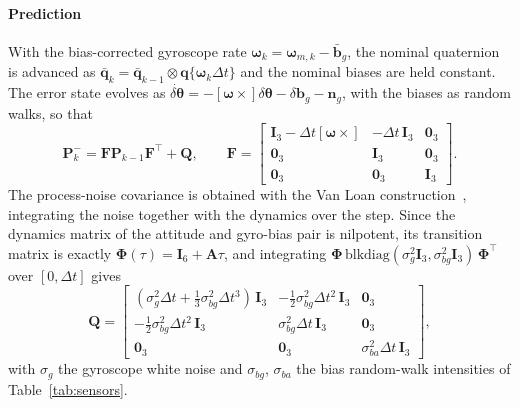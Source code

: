 \documentclass[preprint,12pt,a4paper]{elsarticle}
\begin{document}
\paragraph{Prediction}
With the bias-corrected gyroscope rate $\boldsymbol{\omega}_k=\boldsymbol{\omega}_{m,k}
-\bar{\mathbf{b}}_g$, the nominal quaternion is advanced as
$\bar{\mathbf{q}}_k=\bar{\mathbf{q}}_{k-1}\otimes\mathbf{q}\{\boldsymbol{\omega}_k\Delta t\}$
and the nominal biases are held constant.
The error state evolves as $\dot{\delta\boldsymbol{\theta}}=-[\boldsymbol{\omega}\times]
\delta\boldsymbol{\theta}-\delta\mathbf{b}_g-\mathbf{n}_g$, with the biases as random walks,
so that
\begin{equation}
\mathbf{P}_k^-=\mathbf{F}\mathbf{P}_{k-1}\mathbf{F}^\top+\mathbf{Q},\qquad
\mathbf{F}=\begin{bmatrix}\mathbf{I}_3-\Delta t[\boldsymbol{\omega}\times] &
-\Delta t\,\mathbf{I}_3 & \mathbf{0}_3\\
\mathbf{0}_3 & \mathbf{I}_3 & \mathbf{0}_3\\
\mathbf{0}_3 & \mathbf{0}_3 & \mathbf{I}_3\end{bmatrix}.
\end{equation}
The process-noise covariance is obtained with the Van Loan construction~\cite{VanLoan1978},
integrating the noise together with the dynamics over the step.
Since the dynamics matrix of the attitude and gyro-bias pair is nilpotent, its transition
matrix is exactly $\boldsymbol{\Phi}(\tau)=\mathbf{I}_6+\mathbf{A}\tau$, and integrating
$\boldsymbol{\Phi}\,\mathrm{blkdiag}(\sigma_g^2\mathbf{I}_3,\sigma_{bg}^2\mathbf{I}_3)\,
\boldsymbol{\Phi}^\top$ over $[0,\Delta t]$ gives
\begin{equation}
\mathbf{Q}=\begin{bmatrix}
(\sigma_g^2\Delta t+\frac13\sigma_{bg}^2\Delta t^3)\,\mathbf{I}_3 &
-\frac12\sigma_{bg}^2\Delta t^2\,\mathbf{I}_3 & \mathbf{0}_3\\
-\frac12\sigma_{bg}^2\Delta t^2\,\mathbf{I}_3 & \sigma_{bg}^2\Delta t\,\mathbf{I}_3 &
\mathbf{0}_3\\
\mathbf{0}_3 & \mathbf{0}_3 & \sigma_{ba}^2\Delta t\,\mathbf{I}_3
\end{bmatrix},
\end{equation}
with $\sigma_g$ the gyroscope white noise and $\sigma_{bg}$, $\sigma_{ba}$ the bias
random-walk intensities of Table~\ref{tab:sensors}.
\end{document}
